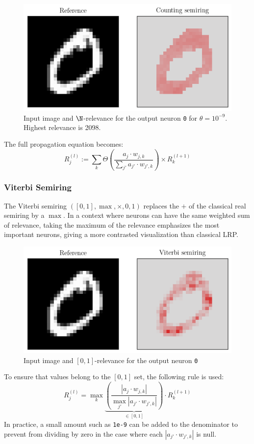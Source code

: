 \documentclass[twocolumn]{../cs-classes/cs-classes}
\newcommand*{\1}{\digitsbb{1}}
\newcommand*{\0}{\digitsbb{0}}
\begin{document}
\begin{figure}[H]
    \centering
    \includegraphics[width=.9\linewidth]{counting.png}
    \caption{Input image and $\N$-relevance for the output neuron \texttt{0} for $\theta=10^{-9}$. Highest relevance is 2098.}
\end{figure}

The full propagation equation becomes:
\begin{equation}
    \tag{$\N$-LRP}
    R^{(l)}_j := \sum_{k}\Theta\left(\frac{a_j\cdot w_{j, k}}{\sum_{j'}a_{j'}\cdot w_{j', k}}\right) \times R^{(l+1)}_k
    \label{eq:counting-lrp}
\end{equation}

\subsubsection{Viterbi Semiring}
The Viterbi semiring $([0, 1], \max, \times, 0, 1)$ replaces the $+$ of the classical real semiring by a $\max$. In a context where neurons can have the same weighted sum of relevance, taking the maximum of the relevance emphasizes the most important neurons, giving a more contrasted visualization than classical LRP. 
\begin{figure}[H]
    \centering
    \includegraphics[width=.9\linewidth]{viterbi.png}
    \caption{Input image and $[0, 1]$-relevance for the output neuron \texttt{0}}
\end{figure}
To ensure that values belong to the $[0, 1]$ set, the following rule is used:
\begin{equation}
    R^{(l)}_j = \max_k \underbrace{\left(\frac{\left|a_j\cdot w_{j, k}\right|}{\max_{j'} \left|a_{j'}\cdot w_{j', k}\right|}\right)}_{\in[0, 1]} \cdot R^{(l+1)}_k
\end{equation}
In practice, a small amount such as \texttt{1e-9} can be added to the denominator to prevent from dividing by zero in the case where each $|a_{j'}\cdot w_{j',k}|$ is null.
\end{document}
